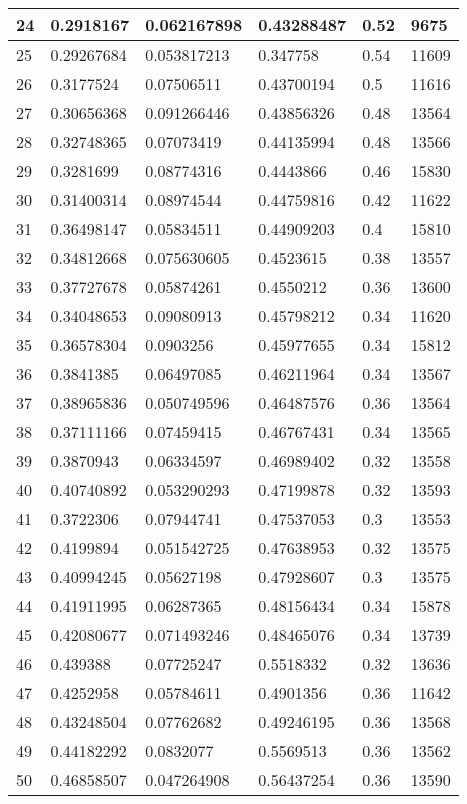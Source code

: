 \begin{longtable}{|l|l|l|l|l|l|}
24 & 0.2918167 & 0.062167898 & 0.43288487 & 0.52 & 9675 \\ \hline 
25 & 0.29267684 & 0.053817213 & 0.347758 & 0.54 & 11609 \\ \hline 
26 & 0.3177524 & 0.07506511 & 0.43700194 & 0.5 & 11616 \\ \hline 
27 & 0.30656368 & 0.091266446 & 0.43856326 & 0.48 & 13564 \\ \hline 
28 & 0.32748365 & 0.07073419 & 0.44135994 & 0.48 & 13566 \\ \hline 
29 & 0.3281699 & 0.08774316 & 0.4443866 & 0.46 & 15830 \\ \hline 
30 & 0.31400314 & 0.08974544 & 0.44759816 & 0.42 & 11622 \\ \hline 
31 & 0.36498147 & 0.05834511 & 0.44909203 & 0.4 & 15810 \\ \hline 
32 & 0.34812668 & 0.075630605 & 0.4523615 & 0.38 & 13557 \\ \hline 
33 & 0.37727678 & 0.05874261 & 0.4550212 & 0.36 & 13600 \\ \hline 
34 & 0.34048653 & 0.09080913 & 0.45798212 & 0.34 & 11620 \\ \hline 
35 & 0.36578304 & 0.0903256 & 0.45977655 & 0.34 & 15812 \\ \hline 
36 & 0.3841385 & 0.06497085 & 0.46211964 & 0.34 & 13567 \\ \hline 
37 & 0.38965836 & 0.050749596 & 0.46487576 & 0.36 & 13564 \\ \hline 
38 & 0.37111166 & 0.07459415 & 0.46767431 & 0.34 & 13565 \\ \hline 
39 & 0.3870943 & 0.06334597 & 0.46989402 & 0.32 & 13558 \\ \hline 
40 & 0.40740892 & 0.053290293 & 0.47199878 & 0.32 & 13593 \\ \hline 
41 & 0.3722306 & 0.07944741 & 0.47537053 & 0.3 & 13553 \\ \hline 
42 & 0.4199894 & 0.051542725 & 0.47638953 & 0.32 & 13575 \\ \hline 
43 & 0.40994245 & 0.05627198 & 0.47928607 & 0.3 & 13575 \\ \hline 
44 & 0.41911995 & 0.06287365 & 0.48156434 & 0.34 & 15878 \\ \hline 
45 & 0.42080677 & 0.071493246 & 0.48465076 & 0.34 & 13739 \\ \hline 
46 & 0.439388 & 0.07725247 & 0.5518332 & 0.32 & 13636 \\ \hline 
47 & 0.4252958 & 0.05784611 & 0.4901356 & 0.36 & 11642 \\ \hline 
48 & 0.43248504 & 0.07762682 & 0.49246195 & 0.36 & 13568 \\ \hline 
49 & 0.44182292 & 0.0832077 & 0.5569513 & 0.36 & 13562 \\ \hline 
50 & 0.46858507 & 0.047264908 & 0.56437254 & 0.36 & 13590 \\ \hline 
\end{longtable}